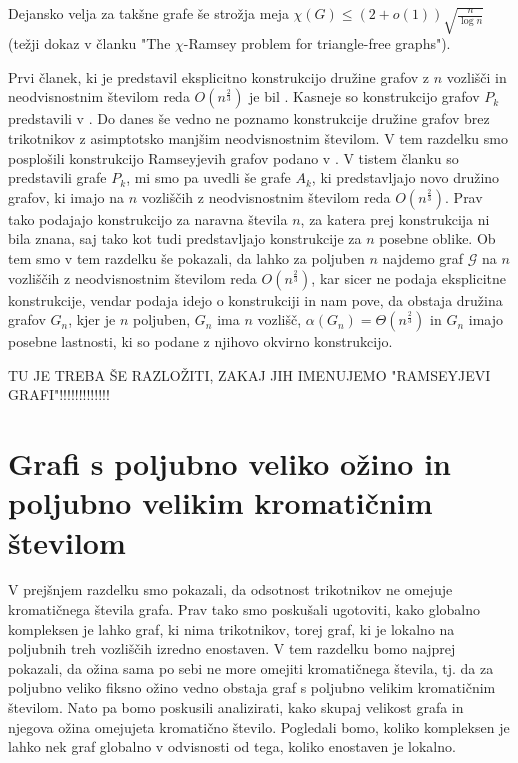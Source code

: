 \documentclass[mat1, tisk]{fmfdelo}
\begin{document}
Dejansko velja za takšne grafe še strožja meja $\chi(G) \leq (2 + o(1))\sqrt{\frac{n}{\log{n}}}$ (težji dokaz v članku "The $\chi$-Ramsey problem for triangle-free graphs").

Prvi članek, ki je predstavil eksplicitno konstrukcijo družine grafov z $n$ vozlišči in neodvisnostnim številom reda $O(n^{\frac{2}{3}})$ je bil \cite{Alon94}. Kasneje so konstrukcijo grafov $P_k$ predstavili v \cite{CodenottiPR00}. Do danes še vedno ne poznamo konstrukcije družine grafov brez trikotnikov
z asimptotsko manjšim neodvisnostnim številom. V tem razdelku smo posplošili konstrukcijo Ramseyjevih grafov podano v \cite{CodenottiPR00}. V tistem članku so predstavili grafe $P_k$, mi smo pa uvedli še grafe $A_k$, ki predstavljajo novo družino grafov, ki imajo na $n$ vozliščih z neodvisnostnim številom reda $O(n^{\frac{2}{3}})$.
Prav tako podajajo konstrukcijo za naravna števila $n$, za katera prej konstrukcija ni bila znana, saj tako \cite{Alon94} kot tudi \cite{CodenottiPR00} predstavljajo konstrukcije za $n$ posebne oblike. Ob tem smo v tem razdelku še pokazali, da lahko za poljuben $n$ najdemo graf $\mathcal{G}$ na $n$ vozliščih
z neodvisnostnim številom reda $O(n^{\frac{2}{3}})$, kar sicer ne podaja eksplicitne konstrukcije, vendar podaja idejo o konstrukciji in nam pove, da obstaja družina grafov $G_n$, kjer je $n$ poljuben, $G_n$ ima $n$ vozlišč, $\alpha(G_n) = \Theta(n^{\frac{2}{3}})$ in $G_n$ imajo posebne lastnosti, ki so podane z 
njihovo okvirno konstrukcijo.

TU JE TREBA ŠE RAZLOŽITI, ZAKAJ JIH IMENUJEMO "RAMSEYJEVI GRAFI"!!!!!!!!!!!!!

\section{Grafi s poljubno veliko ožino in poljubno velikim kromatičnim številom}
V prejšnjem razdelku smo pokazali, da odsotnost trikotnikov ne omejuje kromatičnega števila grafa. Prav tako smo poskušali ugotoviti, kako globalno kompleksen je lahko graf, ki nima trikotnikov, torej graf,
ki je lokalno na poljubnih treh vozliščih izredno enostaven. V tem razdelku bomo najprej pokazali, da ožina sama po sebi ne more omejiti kromatičnega števila, tj. da za poljubno veliko fiksno ožino vedno obstaja
graf s poljubno velikim kromatičnim številom. Nato pa bomo poskusili analizirati, kako skupaj velikost grafa in njegova ožina omejujeta kromatično število. Pogledali bomo, koliko kompleksen je lahko nek graf globalno 
v odvisnosti od tega, koliko enostaven je lokalno.
\end{document}

